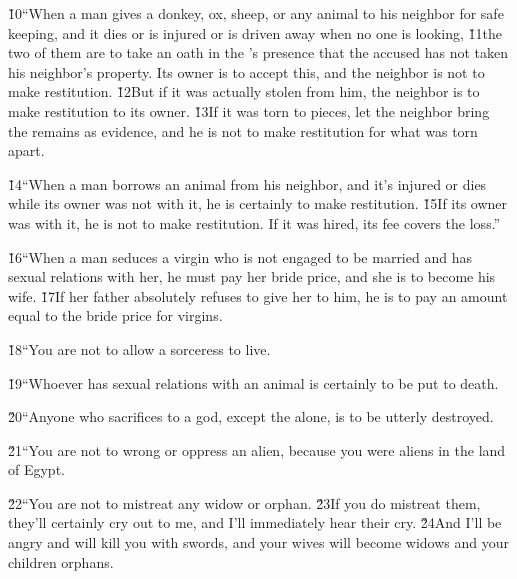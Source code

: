 \v{10}``When a man gives a donkey, ox, sheep, or any animal to his neighbor for safe keeping, and it dies or is injured or is driven away when no one is looking, \v{11}the two of them are to take an oath in the 's presence that the accused has not taken his neighbor's property. Its owner is to accept this, and the neighbor is not to make restitution. \v{12}But if it was actually stolen from him, the neighbor is to make restitution to its owner. \v{13}If it was torn to pieces, let the neighbor bring the remains as evidence, and he is not to make restitution for what was torn apart.

\v{14}``When a man borrows an animal from his neighbor, and it's injured or dies while its owner was not with it, he is certainly to make restitution. \v{15}If its owner was with it, he is not to make restitution. If it was hired, its fee covers the loss.''

\v{16}``When a man seduces a virgin who is not engaged to be married and has sexual relations with her, he must pay her bride price, and she is to become his wife. \v{17}If her father absolutely refuses to give her to him, he is to pay an amount equal to the bride price for virgins.

\v{18}``You are not to allow a sorceress to live.

\v{19}``Whoever has sexual relations with an animal is certainly to be put to death.

\v{20}``Anyone who sacrifices to a god, except the  alone, is to be utterly destroyed.

\v{21}``You are not to wrong or oppress an alien, because you were aliens in the land of Egypt.

\v{22}``You are not to mistreat any widow or orphan. \v{23}If you do mistreat them, they'll certainly cry out to me, and I'll immediately hear their cry. \v{24}And I'll be angry and will kill you with swords, and your wives will become widows and your children orphans.


